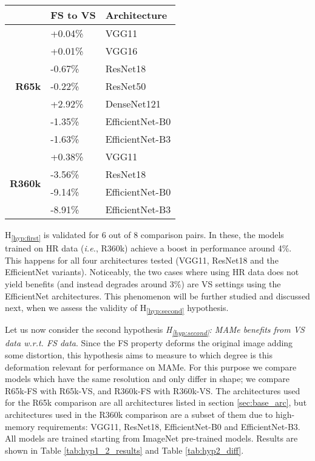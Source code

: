 \documentclass{article}
\newcommand{\hypref}[1]{\textup{H\textsubscript{\ref{#1}}}}
\newcommand{\wrt}{{\it w.r.t. }}    \newcommand{\eg}{\emph{e.g.}, }     \newcommand{\ie}{\emph{i.e.}, }     \newcommand{\etal}{\emph{et al.}}   \newcommand\etc{\emph{etc.}}
\begin{document}
\begin{table}[t]
\begin{minipage}{.49\linewidth}
\begin{tabular}{@{}r|l|l@{}}
                                & \textbf{FS to VS}   & \textbf{Architecture}   \\ \midrule
\multirow{7}{*}{\textbf{R65k}}  & +0.04\%             & VGG11                   \\
                                & +0.01\%             & VGG16                   \\
                                & -0.67\%             & ResNet18                \\
                                & -0.22\%             & ResNet50                \\
                                & +2.92\%             & DenseNet121             \\
                                & -1.35\%             & EfficientNet-B0         \\
                                & -1.63\%             & EfficientNet-B3         \\ \midrule
\multirow{4}{*}{\textbf{R360k}} & +0.38\%             & VGG11                   \\
                                & -3.56\%             & ResNet18                \\
                                & -9.14\%             & EfficientNet-B0         \\
                                & -8.91\%             & EfficientNet-B3         \\                    
\end{tabular}




     \end{minipage}
\end{table}

\hypref{hyp:first} is validated for 6 out of 8 comparison pairs. In these, the models trained on HR data (\ie R360k) achieve a boost in performance around 4\%. This happens for all four architectures tested (VGG11, ResNet18 and the EfficientNet variants). Noticeably, the two cases where using HR data does not yield benefits (and instead degrades around 3\%) are VS settings using the EfficientNet architectures. This phenomenon will be further studied and discussed next, when we assess the validity of \hypref{hyp:second} hypothesis.

Let us now consider the second hypothesis \textit{\hypref{hyp:second}: MAMe benefits from VS data \wrt FS data}. Since the FS property deforms the original image adding some distortion, this hypothesis aims to measure to which degree is this deformation relevant for performance on MAMe. For this purpose we compare models which have the same resolution and only differ in shape; we compare R65k-FS with R65k-VS, and R360k-FS with R360k-VS. The architectures used for the R65k comparison are all architectures listed in section \ref{sec:base_arc}, but architectures used in the R360k comparison are a subset of them due to high-memory requirements: VGG11, ResNet18, EfficientNet-B0 and EfficientNet-B3. All models are trained starting from ImageNet pre-trained models. Results are shown in Table \ref{tab:hyp1_2_results} and Table \ref{tab:hyp2_diff}.
\end{document}
